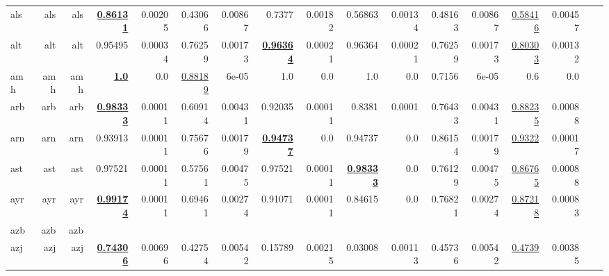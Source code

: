 \documentclass[11pt]{article}
\begin{document}
\begin{table*}[h]
{\begin{tabular}{lrrrrrrrrrrrrrrrr}
als         & als         & als         & \textbf{\underline{0.86131}}         & 0.00205         & 0.43066         & 0.00867         & 0.7377         & 0.00182         & 0.56863         & 0.00134         & 0.48163         & 0.00867         & \underline{0.58416}         & 0.00457         \\
alt         & alt         & alt         & 0.95495         & 0.00034         & 0.76259         & 0.00173         & \textbf{\underline{0.96364}}         & 0.00021         & 0.96364         & 0.00021         & 0.76259         & 0.00173         & \underline{0.80303}         & 0.00132         \\
amh         & amh         & amh         & \textbf{\underline{1.0}}         & 0.0         & \underline{0.88189}         & 6e-05         & 1.0         & 0.0         & 1.0         & 0.0         & 0.7156         & 6e-05         & 0.6         & 0.0         \\
arb         & arb         & arb         & \textbf{\underline{0.98333}}         & 0.00011         & 0.60914         & 0.00431         & 0.92035         & 0.00011         & 0.8381         & 0.0001         & 0.76433         & 0.00431         & \underline{0.88235}         & 0.00088         \\
arn         & arn         & arn         & 0.93913         & 0.00011         & 0.75676         & 0.00179         & \textbf{\underline{0.94737}}         & 0.0         & 0.94737         & 0.0         & 0.86154         & 0.00179         & \underline{0.9322}         & 0.00017         \\
ast         & ast         & ast         & 0.97521         & 0.00011         & 0.57561         & 0.00475         & 0.97521         & 0.00011         & \textbf{\underline{0.98333}}         & 0.0         & 0.76129         & 0.00475         & \underline{0.86765}         & 0.00088         \\
ayr         & ayr         & ayr         & \textbf{\underline{0.99174}}         & 0.00011         & 0.69461         & 0.00274         & 0.91071         & 0.00011         & 0.84615         & 0.0         & 0.76821         & 0.00274         & \underline{0.87218}         & 0.00083         \\
azb         & azb         & azb         &         &          &          &          &         &          &         &          &          &          &          &          \\
azj         & azj         & azj         & \textbf{\underline{0.74306}}         & 0.00696         & 0.42754         & 0.00542         & 0.15789         & 0.00215         & 0.03008         & 0.00113         & 0.45736         & 0.00542         & \underline{0.4739}         & 0.00385         \\

\end{tabular}}
\end{table*}
\end{document}
